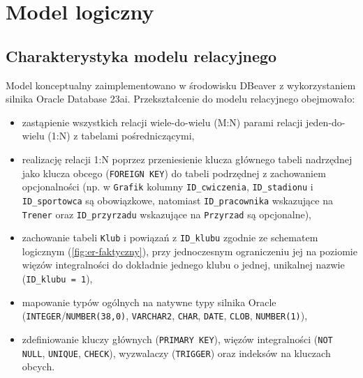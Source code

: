 \documentclass[11pt,a4paper]{article}
\begin{document}
\section{Model logiczny}

\subsection{Charakterystyka modelu relacyjnego}
Model konceptualny zaimplementowano w środowisku DBeaver z wykorzystaniem silnika Oracle Database 23ai. Przekształcenie do modelu relacyjnego obejmowało:
\begin{itemize}
    \item zastąpienie wszystkich relacji wiele-do-wielu (M:N) parami relacji jeden-do-wielu (1:N) z tabelami pośredniczącymi,
    \item realizację relacji 1:N poprzez przeniesienie klucza głównego tabeli nadrzędnej jako klucza obcego (\texttt{FOREIGN KEY}) do tabeli podrzędnej z zachowaniem opcjonalności (np. w \texttt{Grafik} kolumny \texttt{ID\_cwiczenia}, \texttt{ID\_stadionu} i \texttt{ID\_sportowca} są obowiązkowe, natomiast \texttt{ID\_pracownika} wskazujące na \texttt{Trener} oraz \texttt{ID\_przyrzadu} wskazujące na \texttt{Przyrzad} są opcjonalne),
    \item zachowanie tabeli \texttt{Klub} i powiązań z \texttt{ID\_klubu} zgodnie ze schematem logicznym (\cref{fig:er-faktyczny}), przy jednoczesnym ograniczeniu jej na poziomie więzów integralności do dokładnie jednego klubu o jednej, unikalnej nazwie (\texttt{ID\_klubu = 1}),
    \item mapowanie typów ogólnych na natywne typy silnika Oracle (\texttt{INTEGER}/\texttt{NUMBER(38,0)}, \texttt{VARCHAR2}, \texttt{CHAR}, \texttt{DATE}, \texttt{CLOB}, \texttt{NUMBER(1)}),
    \item zdefiniowanie kluczy głównych (\texttt{PRIMARY KEY}), więzów integralności (\texttt{NOT NULL}, \texttt{UNIQUE}, \texttt{CHECK}), wyzwalaczy (\texttt{TRIGGER}) oraz indeksów na kluczach obcych.
\end{itemize}
\end{document}
